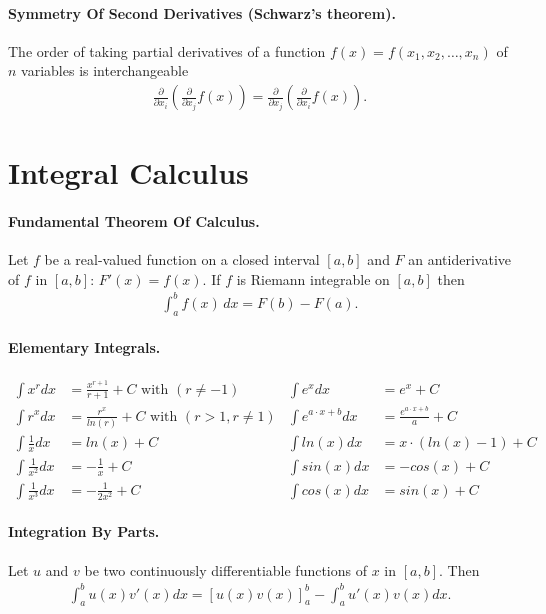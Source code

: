 \documentclass[a4paper,11pt]{article}
\begin{document}
\paragraph{Symmetry Of Second Derivatives (Schwarz's theorem).} The order of taking partial derivatives of a function $f(x) = f(x_1, x_2, \dots , x_n)$ of $n$ variables is interchangeable
\begin{gather*}
    \frac{\partial}{\partial x_i} \left( \frac{\partial}{\partial x_j} f(x) \right) = \frac{\partial}{\partial x_j} \left( \frac{\partial}{\partial x_i} f(x) \right).
\end{gather*}




\section{Integral Calculus} \label{integralCalculus}

\paragraph{Fundamental Theorem Of Calculus.} 
Let  $f$ be a real-valued function on a closed interval $[a,b]$ and $F$ an antiderivative of $f$ in $[a,b]$: $F'(x)=f(x)$. If $f$ is Riemann integrable on $[a,b]$ then
\begin{gather*}
    \int _{a}^{b}f(x)\,dx=F(b)-F(a).
\end{gather*}

\paragraph{Elementary Integrals.}
\begin{align*}
    \int x^r dx &= \frac{x^{r + 1}}{r+1} + C \text{ with } (r \neq -1) 
    &\int e^x dx &= e^x + C \\
    \int r^x dx &= \frac{r^{x}}{ln(r)} + C \text{ with } (r > 1, r \neq 1) 
    &\int e^{a \cdot x + b} dx &= \frac{e^{a \cdot x + b}}{a} + C \\
    \int \frac{1}{x} dx &= ln(x) + C 
    &\int ln(x) dx &= x \cdot (ln(x) - 1) + C \\
    \int \frac{1}{x^2} dx &= - \frac{1}{x} + C 
    &\int sin(x) dx &= - cos(x) + C \\
    \int \frac{1}{x^3} dx &= - \frac{1}{2x^2} + C
    &\int cos(x) dx &= sin(x) + C
\end{align*}

\paragraph{Integration By Parts.} Let $u$ and $v$ be two continuously differentiable functions of $x$ in $[a,b]$. Then
\begin{gather*}
   \int_{a}^{b} u(x)v'(x) dx = \left[ u(x)v(x) \right]_a^b - \int_{a}^{b} u'(x)v(x) dx.
\end{gather*}
\end{document}
